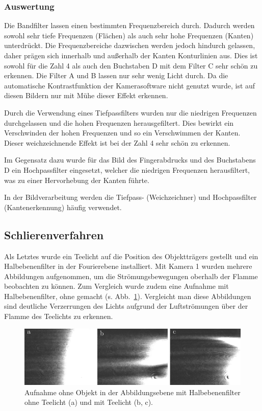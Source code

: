 \subsubsection*{Auswertung}

Die Bandfilter lassen einen bestimmten Frequenzbereich durch. Dadurch werden sowohl sehr tiefe Frequenzen (Flächen) als auch sehr hohe Frequenzen (Kanten) unterdrückt. Die Frequenzbereiche dazwischen werden jedoch hindurch gelassen, daher prägen sich innerhalb und außerhalb der Kanten Konturlinien aus. Dies ist sowohl für die Zahl 4 als auch den Buchstaben D mit dem Filter C sehr schön zu erkennen. Die Filter A und B lassen nur sehr wenig Licht durch. Da die automatische Kontrastfunktion der Kamerasoftware nicht genutzt wurde, ist auf diesen Bildern nur mit Mühe dieser Effekt erkennen.

Durch die Verwendung eines Tiefpassfilters wurden nur die niedrigen Frequenzen durchgelassen und die hohen Frequenzen herausgefiltert. Dies bewirkt ein Verschwinden der hohen Frequenzen und so ein Verschwimmen der Kanten. Dieser weichzeichnende Effekt ist bei der Zahl 4 sehr schön zu erkennen.

Im Gegensatz dazu wurde für das Bild des Fingerabdrucks und des Buchstabens D ein Hochpassfilter eingesetzt, welcher die niedrigen Frequenzen herausfiltert, was zu einer Hervorhebung der Kanten führte.

In der Bildverarbeitung werden die Tiefpass- (Weichzeichner) und Hochpassfilter (Kantenerkennung) häufig verwendet.


\subsection{Schlierenverfahren}
Als Letztes wurde ein Teelicht auf die Position des Objektträgers gestellt und ein Halbebenenfilter in der Fourierebene installiert. Mit Kamera 1 wurden mehrere Abbildungen aufgenommen, um die Strömungsbewegungen oberhalb der Flamme beobachten zu können. Zum Vergleich wurde zudem eine Aufnahme mit Halbebenenfilter, ohne gemacht (s. Abb.~\ref{fig:Halbebenenfilter_mit_und_ohne_Teelicht}). Vergleicht man diese Abbildungen sind deutliche Verzerrungen des Lichts aufgrund der Luftströmungen über der Flamme des Teelichts zu erkennen. 

\begin{figure}[h]
	\centering
	\includegraphics{images/ergebniss_Teelicht/abb.pdf}
	\caption[Sichtbar gemachte Schlieren]{
		Aufnahme ohne Objekt in der Abbildungsebene mit Halbebenenfilter ohne Teelicht (a) und mit Teelicht (b, c).
	}
	\label{fig:Halbebenenfilter_mit_und_ohne_Teelicht}
\end{figure}



